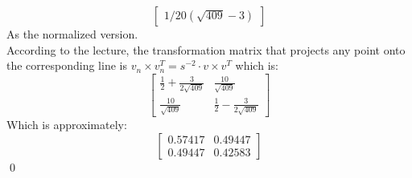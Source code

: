 \begin{itemize}
\[\begin{bmatrix}
                      1/20(\sqrt{409} - 3)
                    \end{bmatrix}\]
            As the normalized version. \\
            According to the lecture, the transformation matrix that projects any point onto the corresponding line is \(v_n \times v_n^T = s^{-2} \cdot v \times v^T\) which is:
            \[\begin{bmatrix}
                \frac{1}{2} + \frac{3}{2 \sqrt{409}} & \frac{10}{\sqrt{409}} \\
                \frac{10}{\sqrt{409}} & \frac{1}{2} - \frac{3}{2 \sqrt{409}}
            \end{bmatrix}\]
            Which is approximately:
            \[\begin{bmatrix}
                0.57417 & 0.49447 \\
                0.49447 & 0.42583
            \end{bmatrix}\]
            \qed
    \end{itemize}
    \pagebreak
